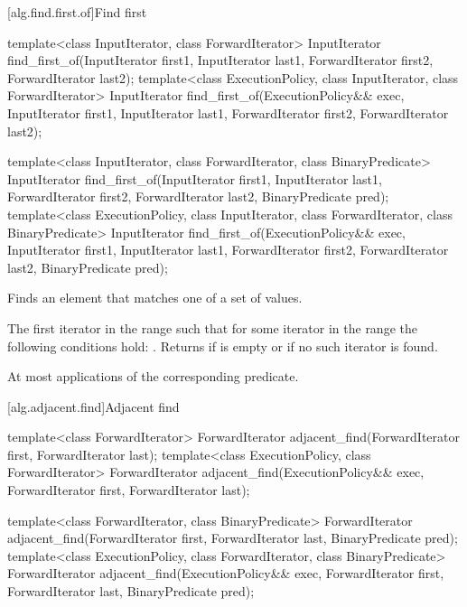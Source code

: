 [alg.find.first.of]{Find first}

%
\begin{itemdecl}
template<class InputIterator, class ForwardIterator>
  InputIterator
    find_first_of(InputIterator first1, InputIterator last1,
                  ForwardIterator first2, ForwardIterator last2);
template<class ExecutionPolicy, class InputIterator, class ForwardIterator>
  InputIterator
    find_first_of(ExecutionPolicy&& exec,
                  InputIterator first1, InputIterator last1,
                  ForwardIterator first2, ForwardIterator last2);

template<class InputIterator, class ForwardIterator,
          class BinaryPredicate>
  InputIterator
    find_first_of(InputIterator first1, InputIterator last1,
                  ForwardIterator first2, ForwardIterator last2,
                  BinaryPredicate pred);
template<class ExecutionPolicy, class InputIterator, class ForwardIterator,
         class BinaryPredicate>
  InputIterator
    find_first_of(ExecutionPolicy&& exec,
                  InputIterator first1, InputIterator last1,
                  ForwardIterator first2, ForwardIterator last2,
                  BinaryPredicate pred);
\end{itemdecl}

\begin{itemdescr}
\pnum
\effects
Finds an element that matches one of a set of values.

\pnum
\returns
The first iterator
in the range 
such that for some
iterator
in the range 
the following conditions hold:
.
Returns 
if  is empty or
if no such iterator is found.

\pnum
\complexity
At most
applications of the corresponding predicate.
\end{itemdescr}

[alg.adjacent.find]{Adjacent find}

%
\begin{itemdecl}
template<class ForwardIterator>
  ForwardIterator adjacent_find(ForwardIterator first, ForwardIterator last);
template<class ExecutionPolicy, class ForwardIterator>
  ForwardIterator adjacent_find(ExecutionPolicy&& exec,
                                ForwardIterator first, ForwardIterator last);

template<class ForwardIterator, class BinaryPredicate>
  ForwardIterator adjacent_find(ForwardIterator first, ForwardIterator last,
                                BinaryPredicate pred);
template<class ExecutionPolicy, class ForwardIterator, class BinaryPredicate>
  ForwardIterator adjacent_find(ExecutionPolicy&& exec,
                                ForwardIterator first, ForwardIterator last,
                                BinaryPredicate pred);
\end{itemdecl}

